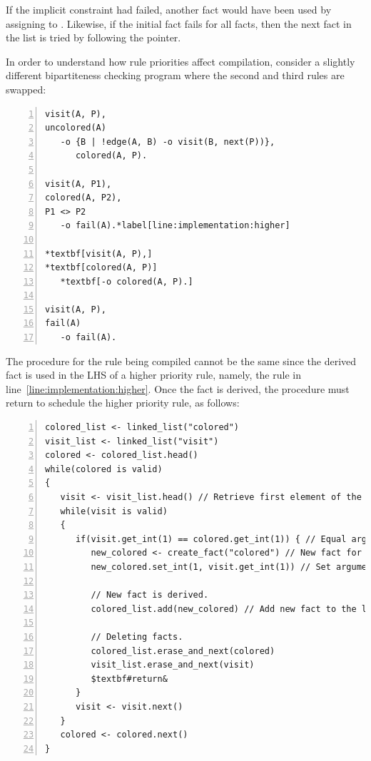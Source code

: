 If the implicit constraint had failed, another  fact would have been
used by assigning  to .  Likewise, if the initial
 fact fails for all  facts, then the next
 fact in the list is tried by following the  pointer.

In order to understand how rule priorities affect compilation, consider a
slightly different bipartiteness checking program where the second and third
rules are swapped:

\begin{Verbatim}[numbers=left,fontsize=\codesize,commandchars=\*\[\]]
visit(A, P),
uncolored(A)
   -o {B | !edge(A, B) -o visit(B, next(P))},
      colored(A, P).

visit(A, P1),
colored(A, P2),
P1 <> P2
   -o fail(A).*label[line:implementation:higher]

*textbf[visit(A, P),]
*textbf[colored(A, P)]
   *textbf[-o colored(A, P).]

visit(A, P),
fail(A)
   -o fail(A).
\end{Verbatim}

The procedure for the rule being compiled cannot be the same since the derived
 fact is used in the LHS of a higher priority rule, namely, the
rule in line~\ref{line:implementation:higher}. Once the  fact is
derived, the procedure must return to schedule the higher priority rule, as
follows:

\begin{Verbatim}[numbers=left,fontsize=\codesize,commandchars=\$\#\&]
colored_list <- linked_list("colored")
visit_list <- linked_list("visit")
colored <- colored_list.head()
while(colored is valid)
{
   visit <- visit_list.head() // Retrieve first element of the list.
   while(visit is valid)
   {
      if(visit.get_int(1) == colored.get_int(1)) { // Equal arguments?
         new_colored <- create_fact("colored") // New fact for predicate colored.
         new_colored.set_int(1, visit.get_int(1)) // Set arguments.

         // New fact is derived.
         colored_list.add(new_colored) // Add new fact to the linked list.

         // Deleting facts.
         colored_list.erase_and_next(colored)
         visit_list.erase_and_next(visit)
         $textbf#return&
      }
      visit <- visit.next()
   }
   colored <- colored.next()
}
\end{Verbatim}

